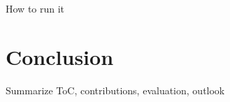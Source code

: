 \documentclass[11pt, a4paper, abstraction]{scrartcl}
\begin{document}
How to run it

% 
% 
% 
% 
% 
% 

\section{Conclusion}

Summarize ToC, contributions, evaluation, outlook
\end{document}
